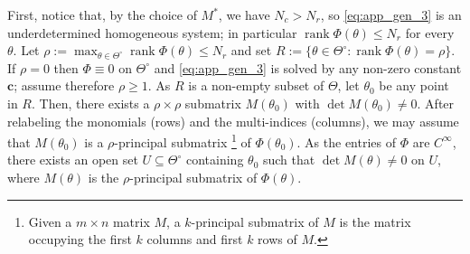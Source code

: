 \documentclass[11pt,twoside]{article} %
\begin{document}
First, notice that, by the choice of $M^*$, we have $N_c>N_r$, so \eqref{eq:app_gen_3} is an underdetermined homogeneous system;
in particular $\operatorname{rank}\Phi(\theta)\le N_r$ for every $\theta$.
Let $\rho:=\max_{\theta\in\Theta^\circ}\operatorname{rank}\Phi(\theta)\le N_r$
and set $R:=\{\theta\in\Theta^\circ:\operatorname{rank}\Phi(\theta)=\rho\}$. If $\rho=0$ then $\Phi\equiv0$ on
$\Theta^\circ$ and \eqref{eq:app_gen_3} is solved by any non-zero constant $\mathbf c$; assume therefore
$\rho\ge1$. As $R$ is a non-empty subset of $\Theta$, let $\theta_0$ be any point in $R$. Then, there exists a $\rho \times \rho$ submatrix $M(\theta_0)$ with $\det M(\theta_0) \neq 0$. After relabeling the monomials (rows) and the multi-indices (columns), we may assume that $M(\theta_0)$ is a $\rho$-principal submatrix \footnote{Given a $m\times n$ matrix $M$, a $k$-principal submatrix of $M$ is the matrix occupying the first $k$ columns and first $k$ rows of $M$.} of $\Phi(\theta_0)$. As the entries
of $\Phi$ are $C^\infty$, there exists an open set $U\subseteq \Theta^\circ $ containing $\theta_0$ such that $\det M(\theta)\ne0$ on $U$, where $M(\theta)$ is the $\rho$-principal submatrix of $\Phi(\theta)$.


\end{document}
